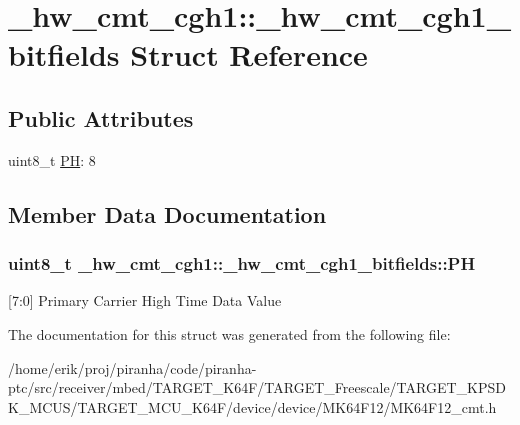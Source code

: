 \hypertarget{struct__hw__cmt__cgh1_1_1__hw__cmt__cgh1__bitfields}{}\section{\+\_\+hw\+\_\+cmt\+\_\+cgh1\+:\+:\+\_\+hw\+\_\+cmt\+\_\+cgh1\+\_\+bitfields Struct Reference}
\label{struct__hw__cmt__cgh1_1_1__hw__cmt__cgh1__bitfields}
\subsection*{Public Attributes}
\begin{DoxyCompactItemize}
\item 
uint8\+\_\+t \hyperlink{struct__hw__cmt__cgh1_1_1__hw__cmt__cgh1__bitfields_a1654e7ff0d3df453ebc981184addbb72}{PH}\+: 8
\end{DoxyCompactItemize}


\subsection{Member Data Documentation}
\subsubsection[{\texorpdfstring{PH}{PH}}]{\setlength{\rightskip}{0pt plus 5cm}uint8\+\_\+t \+\_\+hw\+\_\+cmt\+\_\+cgh1\+::\+\_\+hw\+\_\+cmt\+\_\+cgh1\+\_\+bitfields\+::\+PH}\hypertarget{struct__hw__cmt__cgh1_1_1__hw__cmt__cgh1__bitfields_a1654e7ff0d3df453ebc981184addbb72}{}\label{struct__hw__cmt__cgh1_1_1__hw__cmt__cgh1__bitfields_a1654e7ff0d3df453ebc981184addbb72}
\mbox{[}7\+:0\mbox{]} Primary Carrier High Time Data Value 

The documentation for this struct was generated from the following file\+:\begin{DoxyCompactItemize}
\item 
/home/erik/proj/piranha/code/piranha-\/ptc/src/receiver/mbed/\+T\+A\+R\+G\+E\+T\+\_\+\+K64\+F/\+T\+A\+R\+G\+E\+T\+\_\+\+Freescale/\+T\+A\+R\+G\+E\+T\+\_\+\+K\+P\+S\+D\+K\+\_\+\+M\+C\+U\+S/\+T\+A\+R\+G\+E\+T\+\_\+\+M\+C\+U\+\_\+\+K64\+F/device/device/\+M\+K64\+F12/M\+K64\+F12\+\_\+cmt.\+h\end{DoxyCompactItemize}
